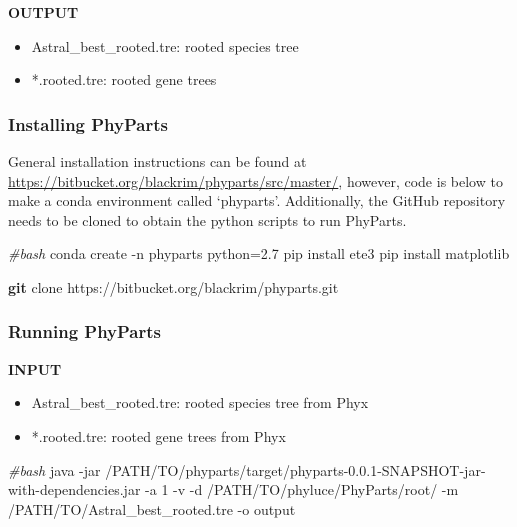 \documentclass[
  12pt,
]{article}
\newenvironment{Shaded}{\begin{snugshade}}{\end{snugshade}}
\newcommand{\AttributeTok}[1]{\textcolor[rgb]{0.13,0.29,0.53}{#1}}
\newcommand{\CommentTok}[1]{\textcolor[rgb]{0.56,0.35,0.01}{\textit{#1}}}
\newcommand{\ExtensionTok}[1]{#1}
\newcommand{\FunctionTok}[1]{\textcolor[rgb]{0.13,0.29,0.53}{\textbf{#1}}}
\newcommand{\NormalTok}[1]{#1}
\providecommand{\tightlist}{%
  \setlength{\itemsep}{0pt}\setlength{\parskip}{0pt}}
\begin{document}
\textbf{OUTPUT}

\begin{itemize}
\tightlist
\item
  Astral\_best\_rooted.tre: rooted species tree
\item
  *.rooted.tre: rooted gene trees
\end{itemize}

\hypertarget{installing-phyparts}{%
\subsubsection{Installing PhyParts}\label{installing-phyparts}}

General installation instructions can be found at \url{https://bitbucket.org/blackrim/phyparts/src/master/}, however, code is below to make a conda environment called `phyparts'. Additionally, the GitHub repository needs to be cloned to obtain the python scripts to run PhyParts.

\begin{Shaded}
\begin{Highlighting}[]
\CommentTok{\#bash}
\ExtensionTok{conda}\NormalTok{ create }\AttributeTok{{-}n}\NormalTok{ phyparts python=2.7}
\ExtensionTok{pip}\NormalTok{ install ete3}
\ExtensionTok{pip}\NormalTok{ install matplotlib}

\FunctionTok{git}\NormalTok{ clone https://bitbucket.org/blackrim/phyparts.git}
\end{Highlighting}
\end{Shaded}

\hypertarget{running-phyparts}{%
\subsubsection{Running PhyParts}\label{running-phyparts}}

\textbf{INPUT}

\begin{itemize}
\tightlist
\item
  Astral\_best\_rooted.tre: rooted species tree from Phyx
\item
  *.rooted.tre: rooted gene trees from Phyx
\end{itemize}

\begin{Shaded}
\begin{Highlighting}[]
\CommentTok{\#bash}
\ExtensionTok{java} \AttributeTok{{-}jar}\NormalTok{ /PATH/TO/phyparts/target/phyparts{-}0.0.1{-}SNAPSHOT{-}jar{-}with{-}dependencies.jar }\AttributeTok{{-}a}\NormalTok{ 1 }\AttributeTok{{-}v} \AttributeTok{{-}d}\NormalTok{ /PATH/TO/phyluce/PhyParts/root/ }\AttributeTok{{-}m}\NormalTok{ /PATH/TO/Astral\_best\_rooted.tre }\AttributeTok{{-}o}\NormalTok{ output}
\end{Highlighting}
\end{Shaded}
\end{document}
